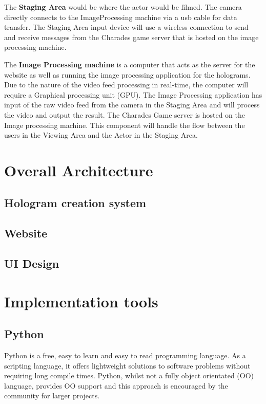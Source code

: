The \textbf{Staging Area} would be where the actor would be filmed. The camera directly connects to the ImageProcessing machine via a usb cable for data transfer. The Staging Area input device will use a wireless connection to send and receive messages from the Charades game server that is hosted on the image processing machine.

The \textbf{Image Processing machine} is a computer that acts as the server for the website as well as running the image processing application for the holograms. Due to the nature of the video feed processing in real-time, the computer will require a Graphical processing unit (GPU). The Image Processing application has input of the raw video feed from the camera in the Staging Area and will process the video and output the result.
The Charades Game server is hosted on the Image processing machine. This component will handle the flow between the users in the Viewing Area and the Actor in the Staging Area.
\section{Overall Architecture}
\subsection{Hologram creation system}

\subsection{Website}

\subsection{UI Design}

\section{Implementation tools}
\subsection{Python}
Python is a free, easy to learn and easy to read programming language. As a scripting language, it offers lightweight solutions to software problems without requiring long compile times. Python, whilst not a fully object orientated (OO) language, provides OO support and this approach is encouraged by the community for larger projects.


